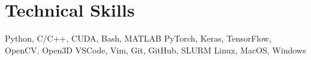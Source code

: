\section{Technical Skills}

\setlength{\multicolsep}{-4pt}
\begin{multicols}{2}
    \raggedcolumns

    \resumeSubHeadingListStart
    {Python, C/C++, CUDA, Bash, MATLAB}
    {PyTorch, Keras, TensorFlow, OpenCV, Open3D}
    {VSCode, Vim, Git, GitHub, SLURM}
    {Linux, MacOS, Windows}
    \resumeSubHeadingListEnd

\end{multicols}

